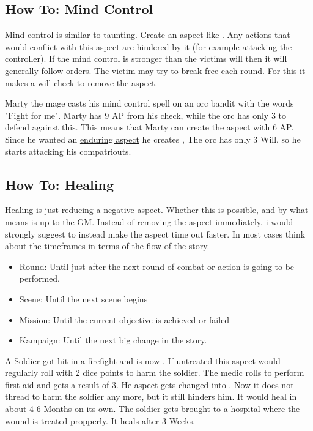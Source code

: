 \documentclass[11pt]{article}
\begin{document}
{\subsection{How To: Mind Control}
\label{sec:orge4b52dd}
Mind control is similar to taunting. Create an aspect like . Any actions that would conflict with this aspect are hindered by it (for example attacking the controller). If the mind control is stronger than the victims will then it will generally follow orders. The victim may try to break free each round. For this it makes a will check to remove the  aspect.

\begin{pwexample}
Marty the mage casts his mind control spell on an orc bandit with the words "Fight for me". Marty has 9 AP from his check, while the orc has only 3 to defend against this. This means that Marty can create the aspect with 6 AP. Since he wanted an \hyperref[sec:orgafbb491]{enduring aspect} he creates , The orc has only 3 Will, so he starts attacking his compatriouts. 
\end{pwexample}
\subsection{How To: Healing}
\label{sec:org2ee5d75}
Healing is just reducing a negative aspect. Whether this is possible, and by what means is up to the GM. Instead of removing the aspect immediately, i would strongly suggest to instead make the aspect time out faster. In most cases think about the timeframes in terms of the flow of the story.
\begin{itemize}
\item Round: Until just after the next round of combat or action is going to be performed.
\item Scene: Until the next scene begins
\item Mission: Until the current objective is achieved or failed
\item Kampaign: Until the next big change in the story.
\end{itemize}

\begin{pwexample}
A Soldier got hit in a firefight and is now . If untreated this aspect would regularly roll with 2 dice points to harm the soldier. The medic rolls to perform first aid and gets a result of 3. He aspect gets changed into . Now it does not thread to harm the soldier any more, but it still hinders him. It would heal in about 4-6 Months on its own. The soldier gets brought to a hospital where the wound is treated propperly. It heals after 3 Weeks. 
\end{pwexample}

}
\end{document}
